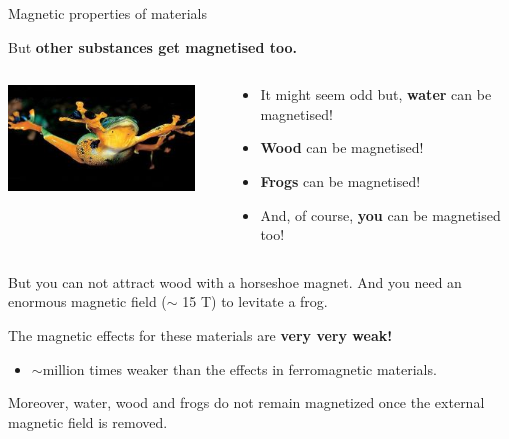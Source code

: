 %
%
%

\begin{frame}{Magnetic properties of materials}

But {\bf other substances get magnetised too.}

\begin{columns}
  \begin{column}{0.50\textwidth}
    \begin{center}
      \includegraphics[width=0.90\textwidth]{./images/photos/levitating_frog_01.jpg}\\
    \end{center}
  \end{column}
  \begin{column}{0.50\textwidth}
    \begin{itemize}
      \item It might seem odd but, {\bf water} can be magnetised!
      \item {\bf Wood} can be magnetised!
      \item {\bf Frogs} can be magnetised!
      \item And, of course, {\bf you} can be magnetised too!
    \end{itemize}
  \end{column}
\end{columns}

\vspace{0.4cm}

But you can not attract wood with a horseshoe magnet.
And you need an enormous magnetic field ($\sim$ 15 T) to levitate a frog.\\

\vspace{0.3cm}

The magnetic effects for these materials are {\bf very very weak!}
\begin{itemize}
  \item $\sim$million times weaker than the effects in ferromagnetic materials.
\end{itemize}
Moreover, water, wood and frogs do not remain magnetized once the external magnetic field is removed.

\end{frame}

